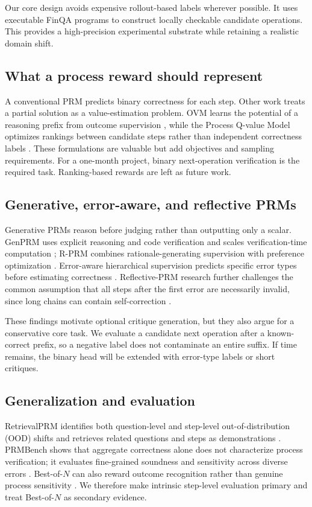 \documentclass[10pt,twocolumn]{article}
\begin{document}
Our core design avoids expensive rollout-based labels wherever possible. It uses executable FinQA programs to construct locally checkable candidate operations. This provides a high-precision experimental substrate while retaining a realistic domain shift.

\subsection{What a process reward should represent}
A conventional PRM predicts binary correctness for each step. Other work treats a partial solution as a value-estimation problem. OVM learns the potential of a reasoning prefix from outcome supervision \citep{ovm2023}, while the Process Q-value Model optimizes rankings between candidate steps rather than independent correctness labels \citep{pqm2025}. These formulations are valuable but add objectives and sampling requirements. For a one-month project, binary next-operation verification is the required task. Ranking-based rewards are left as future work.

\subsection{Generative, error-aware, and reflective PRMs}
Generative PRMs reason before judging rather than outputting only a scalar. GenPRM uses explicit reasoning and code verification and scales verification-time computation \citep{genprm2025}; R-PRM combines rationale-generating supervision with preference optimization \citep{rprm2025}. Error-aware hierarchical supervision predicts specific error types before estimating correctness \citep{pathfinder2025}. Reflective-PRM research further challenges the common assumption that all steps after the first error are necessarily invalid, since long chains can contain self-correction \citep{beyondfirsterror2025}.

These findings motivate optional critique generation, but they also argue for a conservative core task. We evaluate a candidate next operation after a known-correct prefix, so a negative label does not contaminate an entire suffix. If time remains, the binary head will be extended with error-type labels or short critiques.

\subsection{Generalization and evaluation}
RetrievalPRM identifies both question-level and step-level out-of-distribution (OOD) shifts and retrieves related questions and steps as demonstrations \citep{retrievalprm2025}. PRMBench shows that aggregate correctness alone does not characterize process verification; it evaluates fine-grained soundness and sensitivity across diverse errors \citep{prmbench2025}. Best-of-$N$ can also reward outcome recognition rather than genuine process sensitivity \citep{lessonsprm2025}. We therefore make intrinsic step-level evaluation primary and treat Best-of-$N$ as secondary evidence.
\end{document}
